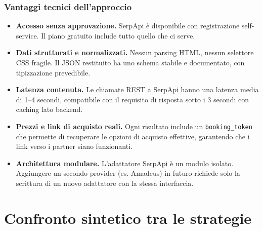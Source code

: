 \documentclass[a4paper, 11pt]{article}
\begin{document}
\subsubsection{Vantaggi tecnici dell'approccio}

\begin{probox}
\begin{itemize}
  \item \textbf{Accesso senza approvazione.} SerpApi \`e disponibile con registrazione self-service. Il piano gratuito include tutto quello che ci serve.
  \item \textbf{Dati strutturati e normalizzati.} Nessun parsing HTML, nessun selettore CSS fragile. Il JSON restituito ha uno schema stabile e documentato, con tipizzazione prevedibile.
  \item \textbf{Latenza contenuta.} Le chiamate REST a SerpApi hanno una latenza media di 1--4 secondi, compatibile con il requisito di risposta sotto i 3 secondi con caching lato backend.
  \item \textbf{Prezzi e link di acquisto reali.} Ogni risultato include un \texttt{booking\_token} che permette di recuperare le opzioni di acquisto effettive, garantendo che i link verso i partner siano funzionanti.
  \item \textbf{Architettura modulare.} L'adattatore SerpApi \`e un modulo isolato. Aggiungere un secondo provider (es. Amadeus) in futuro richiede solo la scrittura di un nuovo adattatore con la stessa interfaccia.
\end{itemize}
\end{probox}

\section{Confronto sintetico tra le strategie}
\end{document}
